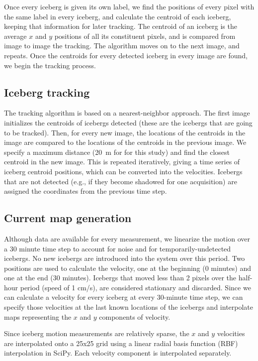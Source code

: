 Once every iceberg is given its own label, we find the positions of every pixel with the same label in every iceberg, and calculate the centroid of each iceberg, keeping that information for later tracking. The centroid of an iceberg is the average $x$ and $y$ positions of all its constituent pixels, and is compared from image to image the tracking. The algorithm moves on to the next image, and repeats. Once the centroids for every detected iceberg in every image are found, we begin the tracking process.

\subsection{Iceberg tracking}
The tracking algorithm is based on a nearest-neighbor approach. The first image initializes the centroids of icebergs detected (these are the icebergs that are going to be tracked). Then, for every new image, the locations of the centroids in the image are compared to the locations of the centroids in the previous image. We specify a maximum distance (20~m for for this study) and find the closest centroid in the new image. This is repeated iteratively, giving a time series of iceberg centroid positions, which can be converted into the velocities. Icebergs that are not detected (e.g., if they become shadowed for one acquisition) are assigned the coordinates from the previous time step.

\subsection{Current map generation}
Although data are available for every measurement, we linearize the motion over a 30 minute time step to account for noise and for temporarily-undetected icebergs. No new icebergs are introduced into the system over this period. Two positions are used to calculate the velocity, one at the beginning (0 minutes) and one at the end (30 minutes). Icebergs that moved less than 2 pixels over the half-hour period (speed of 1 cm/s), are considered stationary and discarded. Since we can calculate a velocity for every iceberg at every 30-minute time step, we can specify those velocities at the last known locations of the icebergs and interpolate maps representing the $x$ and $y$ components of velocity. 


Since iceberg motion measurements are relatively sparse, the $x$ and $y$ velocities are interpolated onto a 25x25 grid using a linear radial basis function (RBF) interpolation in SciPy.  Each velocity component is interpolated separately.

